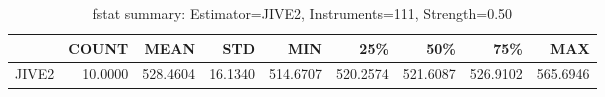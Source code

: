 \begin{table}[ht]
\centering
\caption{fstat summary: Estimator=JIVE2, Instruments=111, Strength=0.50}
\begin{tabular}{lrrrrrrrr}
\toprule
 & COUNT & MEAN & STD & MIN & 25\% & 50\% & 75\% & MAX \\
\midrule
JIVE2 & 10.0000 & 528.4604 & 16.1340 & 514.6707 & 520.2574 & 521.6087 & 526.9102 & 565.6946 \\
\bottomrule
\end{tabular}
\end{table}
